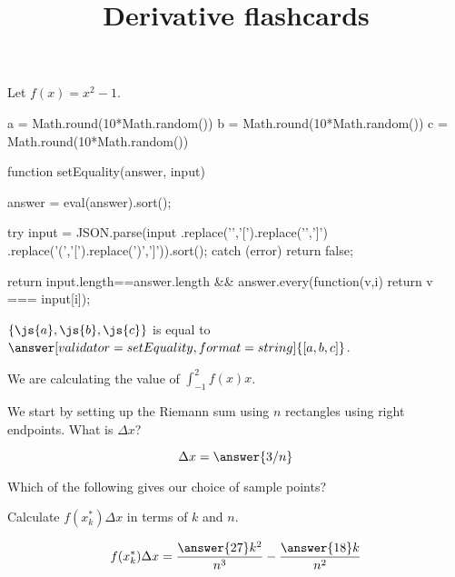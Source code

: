 \documentclass{ximera}
\title{Derivative flashcards}
\begin{document}
\begin{exercise}
Let $f(x) = x^2-1$.

\begin{javascript}
  a = Math.round(10*Math.random())
  b = Math.round(10*Math.random())
  c = Math.round(10*Math.random())  

  function setEquality(answer, input) {
    answer = eval(answer).sort();
    
    try {
      input = JSON.parse(input
        .replace('{','[').replace('}',']')
        .replace('(','[').replace(')',']')).sort();
    } catch (error) {
      return false;
    }
    
     return input.length==answer.length &&
       answer.every(function(v,i) { return v === input[i]});
   }

\end{javascript}

\begin{problem}
  $\{\js{a},\js{b},\js{c}\}$ is equal to $\answer[validator=setEquality,format=string]{[a,b,c]}$.
\end{problem}

We are calculating the value of $\displaystyle \int_{-1}^{2} f(x)  x$.
 

We start by setting up the Riemann sum using $n$ rectangles using right endpoints.
What is $\Delta x$?
     
\[ \Delta x = \answer{3/n} \]

\begin{exercise}
  Which of the following gives our choice of sample points?
  \begin{multipleChoice}
  \end{multipleChoice}
  
  \begin{exercise}
    Calculate $f(x_k^*) \Delta x$ in terms of $k$ and $n$.
    
    \[ f(x_k^*) \Delta x = \frac{\answer{27}k^2}{n^3}-\frac{\answer{18}k}{n^2} \]
  \end{exercise}
\end{exercise}
\end{exercise}
\end{document}
